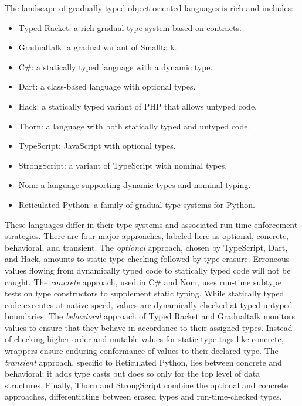 \documentclass[a4paper,USenglish]{lipics-v2018}
\newcounter{lem}
\begin{document}
The landscape of gradually typed object-oriented languages is rich and includes:\medskip
\begin{itemize}
\item Typed Racket: a rich gradual type system based on contracts.
\item Gradualtalk: a gradual variant of Smalltalk.
\item C\#: a statically typed language with a dynamic type.
\item Dart: a class-based language with optional types.
\item Hack: a statically typed variant of PHP that allows untyped code.
\item Thorn: a language with both statically typed and untyped code.
\item TypeScript: JavaScript with optional types.
\item StrongScript: a variant of TypeScript with nominal types.
\item Nom: a language supporting dynamic types and nominal typing.
\item Reticulated Python: a family of gradual type systems for Python.
\end{itemize}
\medskip These languages differ in their type systems and associated
run-time enforcement strategies. There are four major approaches, labeled here
as optional, concrete, behavioral, and transient. The \emph{optional}
approach, chosen by TypeScript, Dart, and Hack, amounts to static
type checking followed by type erasure. Erroneous values flowing from
dynamically typed code to statically typed code will not be caught. The
\emph{concrete} approach, used in C\# and Nom, uses run-time subtype tests
on type constructors to supplement static typing. While statically typed
code executes at native speed, values are dynamically checked at
typed-untyped boundaries. The \emph{behavioral} approach of Typed Racket and
Gradualtalk monitors values to ensure that they behave in accordance to
their assigned types. Instead of checking higher-order and mutable values
for static type tags like concrete, wrappers ensure enduring conformance of
values to their declared type. The \emph{transient} approach, specific to
Reticulated Python, lies between concrete and behavioral; it adds type casts
but does so only for the top level of data structures. Finally, Thorn and
StrongScript combine the optional and concrete approaches, differentiating
between erased types and run-time-checked types.
\end{document}
